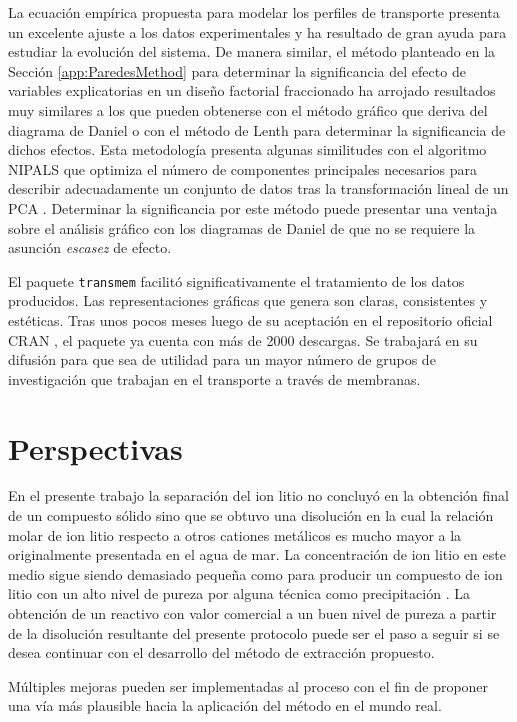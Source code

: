 La ecuación empírica propuesta para modelar los perfiles de transporte presenta un excelente ajuste a los datos experimentales y ha resultado de gran ayuda para estudiar la evolución del sistema. De manera similar, el método planteado en la Sección \ref{app:ParedesMethod} para determinar la significancia del efecto de variables explicatorias en un diseño factorial fraccionado ha arrojado resultados muy similares a los que pueden obtenerse con el método gráfico que deriva del dia\-grama de Daniel o con el método de Lenth para determinar la significancia de dichos efectos. Esta metodología presenta algunas similitudes con el algoritmo \ac{NIPALS} que optimiza el número de componentes principales necesarios para describir adecuadamente un conjunto de datos tras la transformación lineal de un \ac{PCA} \citep{Wehrens2011}. Determinar la significancia por este método puede presentar una ventaja sobre el análisis gráfico con los diagramas de Daniel de que no se requiere la asunción \textit{escasez} de efecto.


El paquete \verb|transmem| facilitó significativamente el tratamiento de los datos producidos. Las repre\-sentaciones gráficas que genera son claras, consistentes y estéticas. Tras unos pocos meses luego de su aceptación en el repositorio oficial \ac{CRAN} \citep{transmem}, el paquete ya cuenta con más de 2000 descargas. Se trabajará en su difusión para que sea de utilidad para un mayor número de grupos de investigación que trabajan en el transporte a través de membranas.

\section{Perspectivas}
En el presente trabajo la separación del ion litio no concluyó en la obtención final de un compuesto sólido sino que se obtuvo una disolución en la cual la relación molar de ion litio respecto a otros cationes metálicos es mucho mayor a la originalmente presentada en el agua de mar. La concentración de ion litio en este medio sigue siendo demasiado pequeña como para producir un compuesto de ion litio con un alto nivel de pureza por alguna técnica como precipitación \citep{Nishihama2011}. La obtención de un reactivo con valor comercial a un buen nivel de pureza a partir de la disolución resultante del presente protocolo puede ser el paso a seguir si se desea continuar con el desarrollo del método de extracción propuesto.

Múltiples mejoras pueden ser implementadas al proceso con el fin de proponer una vía más plausible hacia la aplicación del método en el mundo real.

